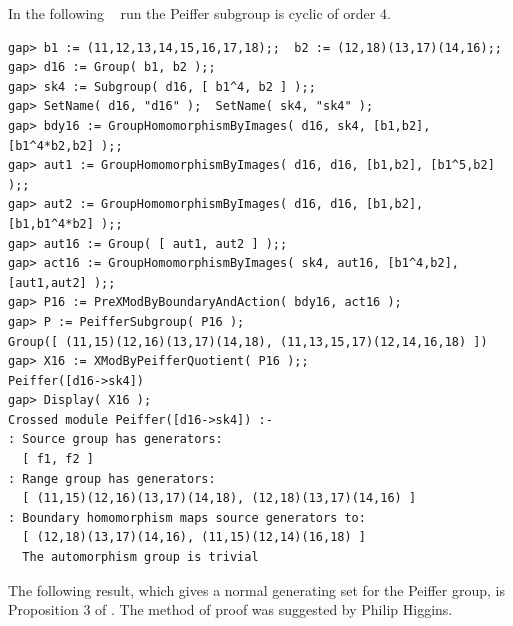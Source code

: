 \begin{example}
In the following \GAP~ run the Peiffer subgroup is cyclic of order $4$. 
{\small 
\begin{verbatim}
gap> b1 := (11,12,13,14,15,16,17,18);;  b2 := (12,18)(13,17)(14,16);;
gap> d16 := Group( b1, b2 );;
gap> sk4 := Subgroup( d16, [ b1^4, b2 ] );;
gap> SetName( d16, "d16" );  SetName( sk4, "sk4" );
gap> bdy16 := GroupHomomorphismByImages( d16, sk4, [b1,b2], [b1^4*b2,b2] );;
gap> aut1 := GroupHomomorphismByImages( d16, d16, [b1,b2], [b1^5,b2] );;
gap> aut2 := GroupHomomorphismByImages( d16, d16, [b1,b2], [b1,b1^4*b2] );;
gap> aut16 := Group( [ aut1, aut2 ] );;
gap> act16 := GroupHomomorphismByImages( sk4, aut16, [b1^4,b2], [aut1,aut2] );;
gap> P16 := PreXModByBoundaryAndAction( bdy16, act16 );
gap> P := PeifferSubgroup( P16 );
Group([ (11,15)(12,16)(13,17)(14,18), (11,13,15,17)(12,14,16,18) ])
gap> X16 := XModByPeifferQuotient( P16 );;
Peiffer([d16->sk4])
gap> Display( X16 );
Crossed module Peiffer([d16->sk4]) :- 
: Source group has generators:
  [ f1, f2 ]
: Range group has generators:
  [ (11,15)(12,16)(13,17)(14,18), (12,18)(13,17)(14,16) ]
: Boundary homomorphism maps source generators to:
  [ (12,18)(13,17)(14,16), (11,15)(12,14)(16,18) ]
  The automorphism group is trivial
\end{verbatim}} 
\end{example} 

\vspace*{5mm}
The following result, 
which gives a normal generating set for the Peiffer group, 
is Proposition 3 of \cite{brow:hueb}.
The method of proof was suggested by Philip Higgins.

